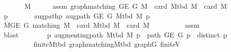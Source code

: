 \begin{isabellebody}
%
\isadelimproof
%
\endisadelimproof
%
\isatagproof
{}\isamarkupfalse%
\ {\isacharminus}{\kern0pt}\isanewline
\ \ \isacommand{{\isacharbraceleft}{\kern0pt}}\isamarkupfalse%
\ \isamarkupfalse%
\ M{\isacharprime}{\kern0pt}\isanewline
\ \ \ \ \isamarkupfalse%
\ assm{\isacharcolon}{\kern0pt}\ {\isachardoublequoteopen}graph{\isacharunderscore}{\kern0pt}matching\ {\isacharparenleft}{\kern0pt}G{\isachardot}{\kern0pt}E\ G{\isacharparenright}{\kern0pt}\ M{\isacharprime}{\kern0pt}\ {\isasymand}\ card\ {\isacharparenleft}{\kern0pt}M{\isacharunderscore}{\kern0pt}tbd\ M{\isacharparenright}{\kern0pt}\ {\isacharless}{\kern0pt}\ card\ M{\isacharprime}{\kern0pt}{\isachardoublequoteclose}\isanewline
\ \ \ \ \isamarkupfalse%
\ p\ \isanewline
\ \ \ \ \ \ augpath{\isacharunderscore}{\kern0pt}p{\isacharcolon}{\kern0pt}\ {\isachardoublequoteopen}augpath\ {\isacharparenleft}{\kern0pt}G{\isachardot}{\kern0pt}E\ G{\isacharparenright}{\kern0pt}\ {\isacharparenleft}{\kern0pt}M{\isacharunderscore}{\kern0pt}tbd\ M{\isacharparenright}{\kern0pt}\ p{\isachardoublequoteclose}\isanewline
\ \ \ \ \isamarkupfalse%
\ {\isacharminus}{\kern0pt}\isanewline
\ \ \ \ \ \ \isamarkupfalse%
\ {\isachardoublequoteopen}{\isasymexists}M{\isacharprime}{\kern0pt}{\isasymsubseteq}{\isacharparenleft}{\kern0pt}G{\isachardot}{\kern0pt}E\ G{\isacharparenright}{\kern0pt}{\isachardot}{\kern0pt}\ matching\ M{\isacharprime}{\kern0pt}\ {\isasymand}\ card\ {\isacharparenleft}{\kern0pt}M{\isacharunderscore}{\kern0pt}tbd\ M{\isacharparenright}{\kern0pt}\ {\isacharless}{\kern0pt}\ card\ M{\isacharprime}{\kern0pt}{\isachardoublequoteclose}\isanewline
\ \ \ \ \ \ \ \ \isamarkupfalse%
\ assm\isanewline
\ \ \ \ \ \ \ \ \isamarkupfalse%
\ blast\isanewline
\ \ \ \ \ \ \isamarkupfalse%
\ {\isachardoublequoteopen}{\isasymexists}p{\isachardot}{\kern0pt}\ augmenting{\isacharunderscore}{\kern0pt}path\ {\isacharparenleft}{\kern0pt}M{\isacharunderscore}{\kern0pt}tbd\ M{\isacharparenright}{\kern0pt}\ p\ {\isasymand}\ path\ {\isacharparenleft}{\kern0pt}G{\isachardot}{\kern0pt}E\ G{\isacharparenright}{\kern0pt}\ p\ {\isasymand}\ distinct\ p{\isachardoublequoteclose}\isanewline
\ \ \ \ \ \ \ \ \isamarkupfalse%
\ finite{\isacharunderscore}{\kern0pt}M{\isacharunderscore}{\kern0pt}tbd\ graph{\isacharunderscore}{\kern0pt}matching{\isacharunderscore}{\kern0pt}M{\isacharunderscore}{\kern0pt}tbd\ graph{\isacharunderscore}{\kern0pt}G\ finite{\isacharunderscore}{\kern0pt}V\isanewline

\end{isabellebody}
